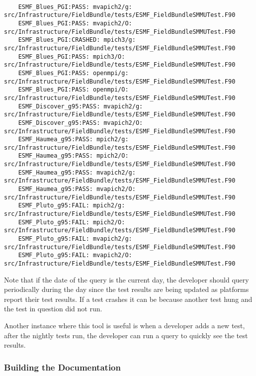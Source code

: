 \begin{verbatim}

	ESMF_Blues_PGI:PASS: mvapich2/g: src/Infrastructure/FieldBundle/tests/ESMF_FieldBundleSMMUTest.F90
	ESMF_Blues_PGI:PASS: mvapich2/O: src/Infrastructure/FieldBundle/tests/ESMF_FieldBundleSMMUTest.F90
	ESMF_Blues_PGI:CRASHED: mpich3/g: src/Infrastructure/FieldBundle/tests/ESMF_FieldBundleSMMUTest.F90
	ESMF_Blues_PGI:PASS: mpich3/O: src/Infrastructure/FieldBundle/tests/ESMF_FieldBundleSMMUTest.F90
	ESMF_Blues_PGI:PASS: openmpi/g: src/Infrastructure/FieldBundle/tests/ESMF_FieldBundleSMMUTest.F90
	ESMF_Blues_PGI:PASS: openmpi/O: src/Infrastructure/FieldBundle/tests/ESMF_FieldBundleSMMUTest.F90
	ESMF_Discover_g95:PASS: mvapich2/g: src/Infrastructure/FieldBundle/tests/ESMF_FieldBundleSMMUTest.F90
	ESMF_Discover_g95:PASS: mvapich2/O: src/Infrastructure/FieldBundle/tests/ESMF_FieldBundleSMMUTest.F90
	ESMF_Haumea_g95:PASS: mpich2/g: src/Infrastructure/FieldBundle/tests/ESMF_FieldBundleSMMUTest.F90
	ESMF_Haumea_g95:PASS: mpich2/O: src/Infrastructure/FieldBundle/tests/ESMF_FieldBundleSMMUTest.F90
	ESMF_Haumea_g95:PASS: mvapich2/g: src/Infrastructure/FieldBundle/tests/ESMF_FieldBundleSMMUTest.F90
	ESMF_Haumea_g95:PASS: mvapich2/O: src/Infrastructure/FieldBundle/tests/ESMF_FieldBundleSMMUTest.F90
	ESMF_Pluto_g95:FAIL: mpich2/g: src/Infrastructure/FieldBundle/tests/ESMF_FieldBundleSMMUTest.F90
	ESMF_Pluto_g95:FAIL: mpich2/O: src/Infrastructure/FieldBundle/tests/ESMF_FieldBundleSMMUTest.F90
	ESMF_Pluto_g95:FAIL: mvapich2/g: src/Infrastructure/FieldBundle/tests/ESMF_FieldBundleSMMUTest.F90
	ESMF_Pluto_g95:FAIL: mvapich2/O: src/Infrastructure/FieldBundle/tests/ESMF_FieldBundleSMMUTest.F90

\end{verbatim}

Note that if the date of the query is the current day, the developer should query periodically during the day since
the test results are being updated as platforms report their test results.
If a test crashes it can be because another test hung and the test in question did not run.

Another instance where this tool is useful is when a developer adds a new test, after the nightly tests run, the developer can run a query to quickly see the test results.

\subsubsection{Building the Documentation}

